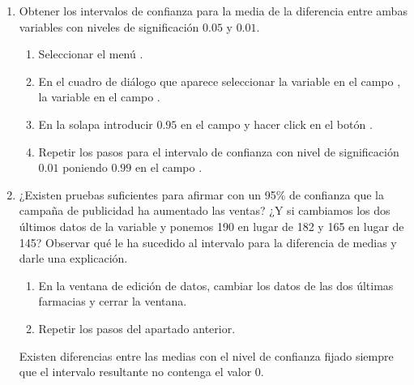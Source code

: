 \begin{enumerate}[leftmargin=*]
\begin{enumerate}
\item Obtener los intervalos de confianza para la media de la diferencia entre ambas variables con niveles de significación $0.05$ y $0.01$.
\begin{indicacion}{
\begin{enumerate}
\item Seleccionar el menú .
\item En el cuadro de diálogo que aparece seleccionar la variable  en el campo , la variable
 en el campo .
\item En la solapa  introducir $0.95$ en el campo  y hacer click en el botón
.
\item Repetir los pasos para el intervalo de confianza con nivel de significación $0.01$ poniendo $0.99$ en el campo .
\end{enumerate}
}
\end{indicacion}

\item ¿Existen pruebas suficientes para afirmar con un 95\% de confianza que la campaña de publicidad ha aumentado las
ventas? ¿Y si cambiamos los dos últimos datos de la variable  y ponemos 190 en lugar de 182 y 165 en
lugar de 145? Observar qué le ha sucedido al intervalo para la diferencia de medias y darle una explicación.
\begin{indicacion}{
\begin{enumerate}
\item En la ventana de edición de datos, cambiar los datos de las dos últimas farmacias y cerrar la ventana.
\item Repetir los pasos del apartado anterior.
\end{enumerate}
Existen diferencias entre las medias con el nivel de confianza fijado siempre que el intervalo resultante no contenga el valor 0.
}
\end{indicacion}
\end{enumerate}



\end{enumerate}
